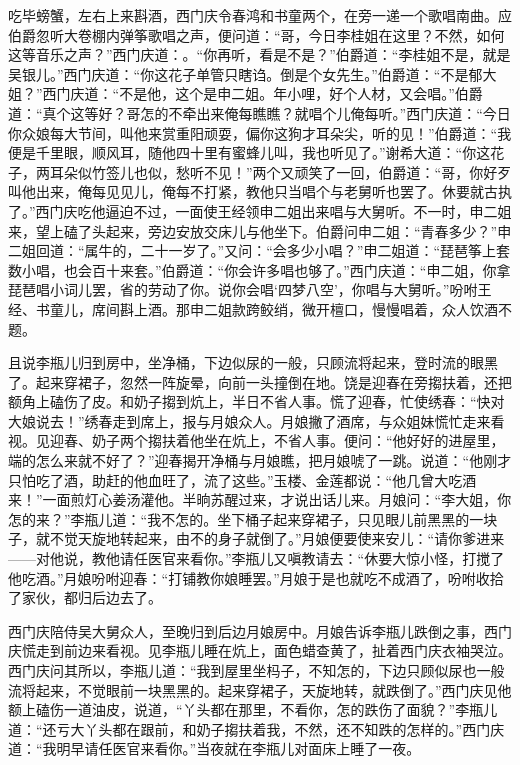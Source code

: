 吃毕螃蟹，左右上来斟酒，西门庆令春鸿和书童两个，在旁一递一个歌唱南曲。应伯爵忽听大卷棚内弹筝歌唱之声，便问道：“哥，今日李桂姐在这里？不然，如何这等音乐之声？”西门庆道：。“你再听，看是不是？”伯爵道：“李桂姐不是，就是吴银儿。”西门庆道：“你这花子单管只瞎诌。倒是个女先生。”伯爵道：“不是郁大姐？”西门庆道：“不是他，这个是申二姐。年小哩，好个人材，又会唱。”伯爵道：“真个这等好？哥怎的不牵出来俺每瞧瞧？就唱个儿俺每听。”西门庆道：“今日你众娘每大节间，叫他来赏重阳顽耍，偏你这狗才耳朵尖，听的见！”伯爵道：“我便是千里眼，顺风耳，随他四十里有蜜蜂儿叫，我也听见了。”谢希大道：“你这花子，两耳朵似竹签儿也似，愁听不见！”两个又顽笑了一回，伯爵道：“哥，你好歹叫他出来，俺每见见儿，俺每不打紧，教他只当唱个与老舅听也罢了。休要就古执了。”西门庆吃他逼迫不过，一面使王经领申二姐出来唱与大舅听。不一时，申二姐来，望上磕了头起来，旁边安放交床儿与他坐下。伯爵问申二姐：“青春多少？”申二姐回道：“属牛的，二十一岁了。”又问：“会多少小唱？”申二姐道：“琵琶筝上套数小唱，也会百十来套。”伯爵道：“你会许多唱也够了。”西门庆道：“申二姐，你拿琵琶唱小词儿罢，省的劳动了你。说你会唱‘四梦八空’，你唱与大舅听。”吩咐王经、书童儿，席间斟上酒。那申二姐款跨鲛绡，微开檀口，慢慢唱着，众人饮酒不题。

且说李瓶儿归到房中，坐净桶，下边似尿的一般，只顾流将起来，登时流的眼黑了。起来穿裙子，忽然一阵旋晕，向前一头撞倒在地。饶是迎春在旁搊扶着，还把额角上磕伤了皮。和奶子搊到炕上，半日不省人事。慌了迎春，忙使绣春：“快对大娘说去！”绣春走到席上，报与月娘众人。月娘撇了酒席，与众姐妹慌忙走来看视。见迎春、奶子两个搊扶着他坐在炕上，不省人事。便问：“他好好的进屋里，端的怎么来就不好了？”迎春揭开净桶与月娘瞧，把月娘唬了一跳。说道：“他刚才只怕吃了酒，助赶的他血旺了，流了这些。”玉楼、金莲都说：“他几曾大吃酒来！”一面煎灯心姜汤灌他。半晌苏醒过来，才说出话儿来。月娘问：“李大姐，你怎的来？”李瓶儿道：“我不怎的。坐下桶子起来穿裙子，只见眼儿前黑黑的一块子，就不觉天旋地转起来，由不的身子就倒了。”月娘便要使来安儿：“请你爹进来——对他说，教他请任医官来看你。”李瓶儿又嗔教请去：“休要大惊小怪，打搅了他吃酒。”月娘吩咐迎春：“打铺教你娘睡罢。”月娘于是也就吃不成酒了，吩咐收拾了家伙，都归后边去了。

西门庆陪侍吴大舅众人，至晚归到后边月娘房中。月娘告诉李瓶儿跌倒之事，西门庆慌走到前边来看视。见李瓶儿睡在炕上，面色蜡查黄了，扯着西门庆衣袖哭泣。西门庆问其所以，李瓶儿道：“我到屋里坐杩子，不知怎的，下边只顾似尿也一般流将起来，不觉眼前一块黑黑的。起来穿裙子，天旋地转，就跌倒了。”西门庆见他额上磕伤一道油皮，说道，“丫头都在那里，不看你，怎的跌伤了面貌？”李瓶儿道：“还亏大丫头都在跟前，和奶子搊扶着我，不然，还不知跌的怎样的。”西门庆道：“我明早请任医官来看你。”当夜就在李瓶儿对面床上睡了一夜。

